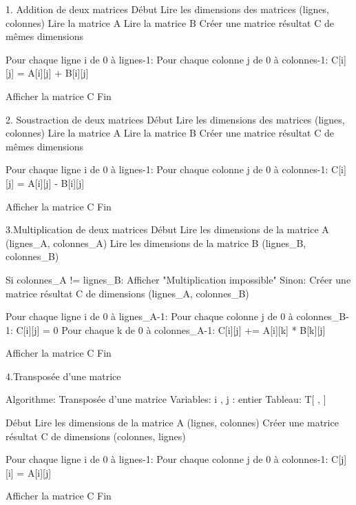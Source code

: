 1. Addition de deux matrices
Début
    Lire les dimensions des matrices (lignes, colonnes)
    Lire la matrice A
    Lire la matrice B
    Créer une matrice résultat C de mêmes dimensions

    Pour chaque ligne i de 0 à lignes-1:
        Pour chaque colonne j de 0 à colonnes-1:
            C[i][j] = A[i][j] + B[i][j]
    
    Afficher la matrice C
Fin

2. Soustraction de deux matrices
Début
    Lire les dimensions des matrices (lignes, colonnes)
    Lire la matrice A
    Lire la matrice B
    Créer une matrice résultat C de mêmes dimensions

    Pour chaque ligne i de 0 à lignes-1:
        Pour chaque colonne j de 0 à colonnes-1:
            C[i][j] = A[i][j] - B[i][j]
    
    Afficher la matrice C
Fin

3.Multiplication de deux matrices
Début
    Lire les dimensions de la matrice A (lignes_A, colonnes_A)
    Lire les dimensions de la matrice B (lignes_B, colonnes_B)
    
    Si colonnes_A != lignes_B:
        Afficher "Multiplication impossible"
    Sinon:
        Créer une matrice résultat C de dimensions (lignes_A, colonnes_B)

        Pour chaque ligne i de 0 à lignes_A-1:
            Pour chaque colonne j de 0 à colonnes_B-1:
                C[i][j] = 0
                Pour chaque k de 0 à colonnes_A-1:
                    C[i][j] += A[i][k] * B[k][j]
        
        Afficher la matrice C
Fin

4.Transposée d'une matrice

Algorithme:  Transposée d'une matrice
Variables: i , j : entier
Tableau: T[ , ] 


Début
    Lire les dimensions de la matrice A (lignes, colonnes)
    Créer une matrice résultat C de dimensions (colonnes, lignes)

    Pour chaque ligne i de 0 à lignes-1:
        Pour chaque colonne j de 0 à colonnes-1:
            C[j][i] = A[i][j]
    
    Afficher la matrice C
Fin